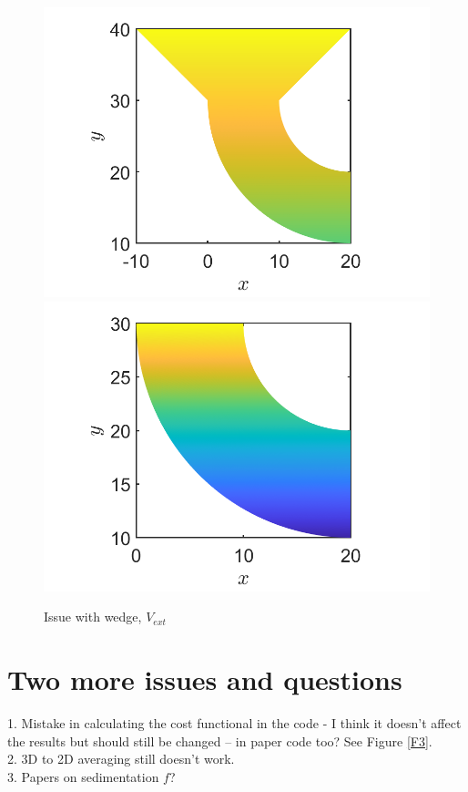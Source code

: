 \documentclass[11pt, a4paper]{article}
\theoremstyle{definition}
\begin{document}
	\begin{figure}[h]
		\centering
		\includegraphics[scale=0.35]{demo5.png}
		\includegraphics[scale=0.35]{demo6.png}
		\caption{Issue with wedge, $V_{ext}$} 
		\label{F2b}
	\end{figure}

	\section{Two more issues and questions}
	1. Mistake in calculating the cost functional in the code - I think it doesn't affect the results but should still be changed -- in paper code too? See Figure \ref{F3}.\\
	2. 3D to 2D averaging still doesn't work.\\
	3. Papers on sedimentation $f$?
	
\end{document}
